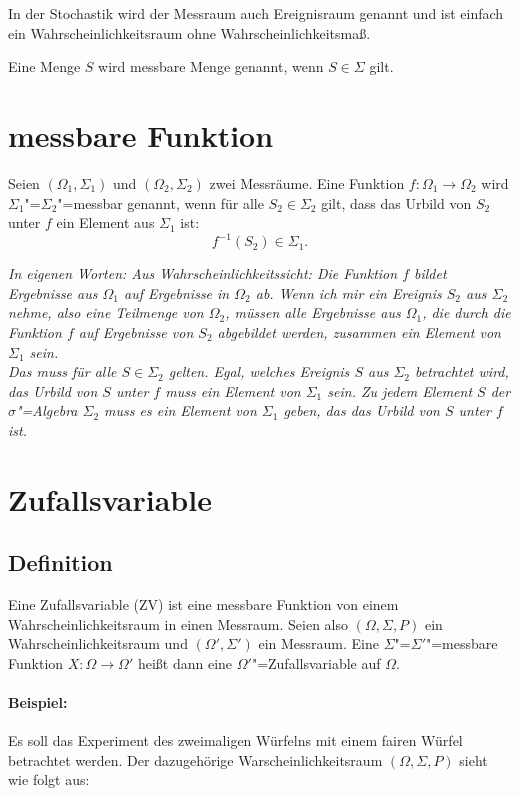 \documentclass[paper=a4,10pt]{scrartcl}
\begin{document}
\noindent
In der Stochastik wird der Messraum auch Ereignisraum genannt und ist einfach ein Wahrscheinlichkeitsraum ohne Wahrscheinlichkeitsmaß.

\noindent
Eine Menge $S$ wird messbare Menge genannt, wenn $S \in \Sigma$ gilt.

\section{messbare Funktion} \label{sec:messbar}
Seien $(\Omega_1, \Sigma_1)$ und $(\Omega_2, \Sigma_2)$ zwei Messräume. Eine Funktion $f: \Omega_1 \rightarrow \Omega_2$ wird $\Sigma_1$"=$\Sigma_2$"=messbar genannt, wenn für alle $S_2 \in \Sigma_2$ gilt, dass das Urbild von $S_2$ unter $f$ ein Element aus $\Sigma_1$ ist:
\begin{equation}
f^{-1}(S_2) \in \Sigma_1.
\end{equation}

\noindent
\textit{In eigenen Worten: Aus Wahrscheinlichkeitssicht: Die Funktion $f$ bildet Ergebnisse aus $\Omega_1$ auf Ergebnisse in $\Omega_2$ ab. Wenn ich mir ein Ereignis $S_2$ aus $\Sigma_2$ nehme, also eine Teilmenge von $\Omega_2$, müssen alle Ergebnisse aus $\Omega_1$, die durch die Funktion $f$ auf Ergebnisse von $S_2$ abgebildet werden, zusammen ein Element von $\Sigma_1$ sein. \\
Das muss für alle $S \in  \Sigma_2$ gelten. Egal, welches Ereignis $S$ aus $\Sigma_2$ betrachtet wird, das Urbild von $S$ unter $f$ muss ein Element von $\Sigma_1$ sein. Zu jedem Element $S$ der $\sigma$"=Algebra $\Sigma_2$ muss es ein Element von $\Sigma_1$ geben, das das Urbild von $S$ unter $f$ ist.}

\section{Zufallsvariable}
\subsection{Definition}
Eine Zufallsvariable (ZV) ist eine messbare Funktion von einem Wahrscheinlichkeitsraum in einen Messraum. Seien also $(\Omega, \Sigma , P)$ ein Wahrscheinlichkeitsraum und $(\Omega', \Sigma')$ ein Messraum. Eine $\Sigma$"=$\Sigma'$"=messbare Funktion $X:\Omega \rightarrow \Omega'$ heißt dann eine $\Omega'$"=Zufallsvariable auf $\Omega$.

\paragraph{Beispiel:} Es soll das Experiment des zweimaligen Würfelns mit einem fairen Würfel betrachtet werden. Der dazugehörige Warscheinlichkeitsraum $(\Omega, \Sigma, P)$ sieht wie folgt aus:
\end{document}
